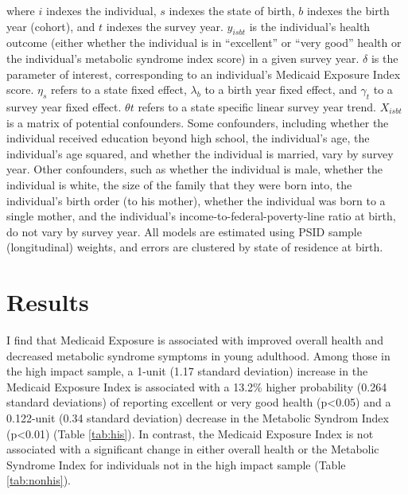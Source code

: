 \documentclass[12pt]{article}
\begin{document}
where $i$ indexes the individual, $s$ indexes the state of birth, $b$ indexes the birth year (cohort), and $t$ indexes the survey year. $y_{isbt}$ is the individual's health outcome (either whether the individual is in ``excellent'' or ``very good'' health or the individual's metabolic syndrome index score) in a given survey year. $\delta$ is the parameter of interest, corresponding to an individual's Medicaid Exposure Index score. $\eta_s$ refers to a state fixed effect, $\lambda_b$ to a birth year fixed effect, and $\gamma_t$ to a survey year fixed effect. $\theta t$ refers to a state specific linear survey year trend. $X_{isbt}$ is a matrix of potential confounders. Some confounders, including whether the individual received education beyond high school, the individual's age, the individual's age squared, and whether the individual is married, vary by survey year. Other confounders, such as whether the individual is male, whether the individual is white, the size of the family that they were born into, the individual's birth order (to his mother), whether the individual was born to a single mother, and the individual's income-to-federal-poverty-line ratio at birth, do not vary by survey year. All models are estimated using PSID sample (longitudinal) weights, and errors are clustered by state of residence at birth.


\clearpage
\section{Results} \label{sec:result}


I find that Medicaid Exposure is associated with improved overall health and decreased metabolic syndrome symptoms in young adulthood. Among those in the high impact sample, a 1-unit (1.17 standard deviation) increase in the Medicaid Exposure Index is associated with a 13.2\% higher probability (0.264 standard deviations) of reporting excellent or very good health (p<0.05) and a 0.122-unit (0.34 standard deviation) decrease in the Metabolic Syndrom Index (p<0.01) (Table \ref{tab:his}). In contrast, the Medicaid Exposure Index is not associated with a significant change in either overall health or the Metabolic Syndrome Index for individuals not in the high impact sample (Table \ref{tab:nonhis}).


%   
\end{document}
